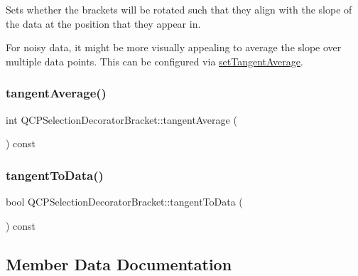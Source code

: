 Sets whether the brackets will be rotated such that they align with the slope of the data at the position that they appear in.

For noisy data, it might be more visually appealing to average the slope over multiple data points. This can be configured via \mbox{\hyperlink{class_q_c_p_selection_decorator_bracket_adb2d0876f25a77c88042b70818f1d6e4}{set\+Tangent\+Average}}. \mbox{\label{class_q_c_p_selection_decorator_bracket_a4e21ee2db0f43c1208d2e30879ec6a3c}} 
\subsubsection{\texorpdfstring{tangentAverage()}{tangentAverage()}}
{\footnotesize\ttfamily int Q\+C\+P\+Selection\+Decorator\+Bracket\+::tangent\+Average (\begin{DoxyParamCaption}{ }\end{DoxyParamCaption}) const\hspace{0.3cm}{\ttfamily [inline]}}

\mbox{\label{class_q_c_p_selection_decorator_bracket_a257cb5f8b822edc839c1510ed0f23f13}} 
\subsubsection{\texorpdfstring{tangentToData()}{tangentToData()}}
{\footnotesize\ttfamily bool Q\+C\+P\+Selection\+Decorator\+Bracket\+::tangent\+To\+Data (\begin{DoxyParamCaption}{ }\end{DoxyParamCaption}) const\hspace{0.3cm}{\ttfamily [inline]}}



\subsection{Member Data Documentation}
\mbox{\label{class_q_c_p_selection_decorator_bracket_ae905dd458b85ac529fb9c6ec879e5680}} 
